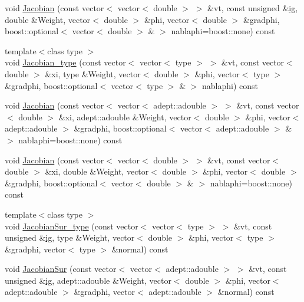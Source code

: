 \begin{DoxyCompactItemize}
\item 
void \mbox{\hyperlink{classfemus_1_1elem__type__1_d_aec9766e008c3f7536a4a68d87302b254}{Jacobian}} (const vector$<$ vector$<$ double $>$ $>$ \&vt, const unsigned \&\mbox{\hyperlink{namespacefemus_a6df31099f676311de214a312d7043941}{ig}}, double \&Weight, vector$<$ double $>$ \&phi, vector$<$ double $>$ \&gradphi, boost\+::optional$<$ vector$<$ double $>$ \& $>$ nablaphi=boost\+::none) const
\item 
{\footnotesize template$<$class type $>$ }\\void \mbox{\hyperlink{classfemus_1_1elem__type__1_d_ad6061e34ea1a15f99e49a466987e38e0}{Jacobian\+\_\+type}} (const vector$<$ vector$<$ type $>$ $>$ \&vt, const vector$<$ double $>$ \&xi, type \&Weight, vector$<$ double $>$ \&phi, vector$<$ type $>$ \&gradphi, boost\+::optional$<$ vector$<$ type $>$ \& $>$ nablaphi) const
\item 
void \mbox{\hyperlink{classfemus_1_1elem__type__1_d_a6209ff2d3d1b74ac6f1ee1eb9140908e}{Jacobian}} (const vector$<$ vector$<$ adept\+::adouble $>$ $>$ \&vt, const vector$<$ double $>$ \&xi, adept\+::adouble \&Weight, vector$<$ double $>$ \&phi, vector$<$ adept\+::adouble $>$ \&gradphi, boost\+::optional$<$ vector$<$ adept\+::adouble $>$ \& $>$ nablaphi=boost\+::none) const
\item 
void \mbox{\hyperlink{classfemus_1_1elem__type__1_d_ac6814828a90c49fd5b29df4b5d161653}{Jacobian}} (const vector$<$ vector$<$ double $>$ $>$ \&vt, const vector$<$ double $>$ \&xi, double \&Weight, vector$<$ double $>$ \&phi, vector$<$ double $>$ \&gradphi, boost\+::optional$<$ vector$<$ double $>$ \& $>$ nablaphi=boost\+::none) const
\item 
{\footnotesize template$<$class type $>$ }\\void \mbox{\hyperlink{classfemus_1_1elem__type__1_d_a18dd785c7dfb85f18d6a799558b63bc0}{Jacobian\+Sur\+\_\+type}} (const vector$<$ vector$<$ type $>$ $>$ \&vt, const unsigned \&\mbox{\hyperlink{namespacefemus_a6df31099f676311de214a312d7043941}{ig}}, type \&Weight, vector$<$ double $>$ \&phi, vector$<$ type $>$ \&gradphi, vector$<$ type $>$ \&normal) const
\item 
void \mbox{\hyperlink{classfemus_1_1elem__type__1_d_a30e236ab3052558a85af26d862715540}{Jacobian\+Sur}} (const vector$<$ vector$<$ adept\+::adouble $>$ $>$ \&vt, const unsigned \&\mbox{\hyperlink{namespacefemus_a6df31099f676311de214a312d7043941}{ig}}, adept\+::adouble \&Weight, vector$<$ double $>$ \&phi, vector$<$ adept\+::adouble $>$ \&gradphi, vector$<$ adept\+::adouble $>$ \&normal) const

\end{DoxyCompactItemize}
